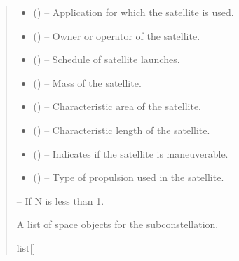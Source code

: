\documentclass[letterpaper,10pt,english]{sphinxmanual}
\begin{document}
\begin{fulllineitems}
\begin{quote}
\begin{description}
\begin{itemize}
\item {} 
\sphinxAtStartPar
{} () – Application for which the satellite is used.

\item {} 
\sphinxAtStartPar
{} () – Owner or operator of the satellite.

\item {} 
\sphinxAtStartPar
{} (\sphinxstyleliteralemphasis{\sphinxupquote{{[}}}\sphinxstyleliteralemphasis{\sphinxupquote{{]}}}) – Schedule of satellite launches.

\item {} 
\sphinxAtStartPar
{} () – Mass of the satellite.

\item {} 
\sphinxAtStartPar
{} () – Characteristic area of the satellite.

\item {} 
\sphinxAtStartPar
{} () – Characteristic length of the satellite.

\item {} 
\sphinxAtStartPar
{} () – Indicates if the satellite is maneuverable.

\item {} 
\sphinxAtStartPar
{} () – Type of propulsion used in the satellite.

\end{itemize}

\sphinxAtStartPar
{} – If N is less than 1.

\sphinxAtStartPar
A list of space objects for the sub\sphinxhyphen{}constellation.

\sphinxAtStartPar
list{[}{\hyperref[\detokenize{fspsim.utils:fspsim.utils.SpaceObject.SpaceObject}]{}}{]}

\end{description}\end{quote}

\end{fulllineitems}
\end{document}
